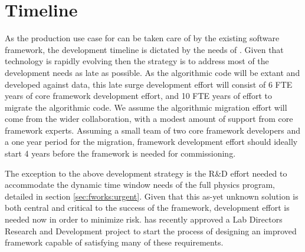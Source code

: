 \documentclass[../main-v1.tex]{subfiles}
\begin{document}
\section{Timeline}

As the production use case for  can be taken care of by the existing software framework, the development timeline is dictated by the needs of .  Given that technology is rapidly evolving then the strategy is to address most of the development needs as late as possible. As the algorithmic code will be extant and developed against  data, this late surge development effort will consist of 6 FTE years of core framework development effort, and 10 FTE years of effort to migrate the algorithmic code.  We assume the algorithmic migration effort will come from the wider collaboration, with a modest amount of support from core framework experts.
Assuming a small team of two core framework developers
and a one year period for the migration, framework development effort should ideally start 4 years before the framework is needed for commissioning.

The exception to the above development strategy is the R\&D effort needed to accommodate the dynamic time window needs of the full  physics program, detailed in section \ref{sec:fworks:urgent}.  Given that this as-yet unknown solution is both central and critical to the success of the framework, development effort is needed now in order to minimize risk.
 has recently approved a Lab Directors Research and Development project to start the process of designing an improved framework capable of satisfying many of these requirements. 




\end{document}
